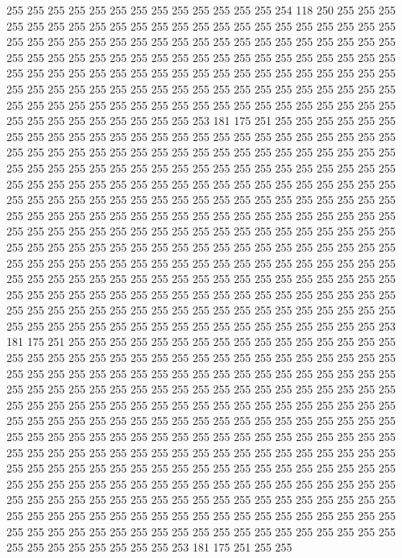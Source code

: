 255 255 255 255 255 255 255 255 255 255 255 255 255 254 118 250 255 255 255 255
255 255 255 255 255 255 255 255 255 255 255 255 255 255 255 255 255 255 255 255
255 255 255 255 255 255 255 255 255 255 255 255 255 255 255 255 255 255 255 255
255 255 255 255 255 255 255 255 255 255 255 255 255 255 255 255 255 255 255 255
255 255 255 255 255 255 255 255 255 255 255 255 255 255 255 255 255 255 255 255
255 255 255 255 255 255 255 255 255 255 255 255 255 255 255 255 255 255 255 255
255 255 255 255 255 255 255 255 255 255 255 255 255 255 255 255 255 255 255 255
255 255 253 181 175 251 255 255 255 255 255 255 255 255 255 255 255 255 255 255
255 255 255 255 255 255 255 255 255 255 255 255 255 255 255 255 255 255 255 255
255 255 255 255 255 255 255 255 255 255 255 255 255 255 255 255 255 255 255 255
255 255 255 255 255 255 255 255 255 255 255 255 255 255 255 255 255 255 255 255
255 255 255 255 255 255 255 255 255 255 255 255 255 255 255 255 255 255 255 255
255 255 255 255 255 255 255 255 255 255 255 255 255 255 255 255 255 255 255 255
255 255 255 255 255 255 255 255 255 255 255 255 255 255 255 255 255 255 255 255
255 255 255 255 255 255 255 255 255 255 255 255 255 255 255 255 255 255 255 255
255 255 255 255 255 255 255 255 255 255 255 255 255 255 255 255 255 255 255 255
255 255 255 255 255 255 255 255 255 255 255 255 255 255 255 255 255 255 255 255
255 255 255 255 255 255 255 255 255 255 255 255 255 255 255 255 255 255 255 255
255 255 255 255 255 255 255 255 255 255 255 255 255 255 255 255 255 255 255 255
255 255 255 255 255 255 255 255 255 255 255 255 255 255 255 255 255 255 253 181
175 251 255 255 255 255 255 255 255 255 255 255 255 255 255 255 255 255 255 255
255 255 255 255 255 255 255 255 255 255 255 255 255 255 255 255 255 255 255 255
255 255 255 255 255 255 255 255 255 255 255 255 255 255 255 255 255 255 255 255
255 255 255 255 255 255 255 255 255 255 255 255 255 255 255 255 255 255 255 255
255 255 255 255 255 255 255 255 255 255 255 255 255 255 255 255 255 255 255 255
255 255 255 255 255 255 255 255 255 255 255 255 255 255 255 255 255 255 255 255
255 255 255 255 255 255 255 255 255 255 255 255 255 255 255 255 255 255 255 255
255 255 255 255 255 255 255 255 255 255 255 255 255 255 255 255 255 255 255 255
255 255 255 255 255 255 255 255 255 255 255 255 255 255 255 255 255 255 255 255
255 255 255 255 255 255 255 255 255 255 255 255 255 255 255 255 255 255 255 255
255 255 255 255 255 255 255 255 255 255 255 255 255 255 255 255 255 255 255 255
255 255 255 255 255 255 255 255 255 255 255 255 255 255 255 255 255 255 255 255
255 255 255 255 255 255 255 255 255 255 255 255 255 255 253 181 175 251 255 255
